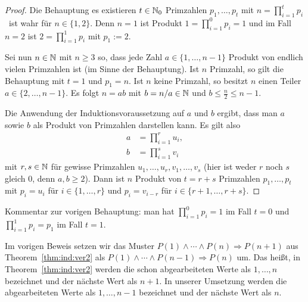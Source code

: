 \begin{proof} 
	Die Behauptung \glqq es existieren $t \in \mathbb{N}_0$ Primzahlen $p_1,\ldots,p_t$ mit $n=\prod_{i=1}^t p_i$\grqq\ ist wahr für $n \in\{1,2\}$. Denn $n=1$ ist Produkt $1= \prod_{i=1}^0 p_i = 1$ und im Fall $n=2$ ist $2 = \prod_{i=1}^1 p_i$ mit $p_1:=2$.
	
	Sei nun $n \in \mathbb{N}$ mit $n \ge 3$ so, dass jede Zahl $a \in \{1,\ldots,n-1\}$ Produkt von endlich vielen Primzahlen ist (im Sinne der Behauptung). Ist $n$ Primzahl, so gilt die Behauptung mit $t=1$ und $p_1 = n$. Ist $n$ keine Primzahl, so besitzt $n$ einen Teiler $a \in \{2,\ldots,n-1\}$. Es folgt $n = a b$ mit $b = n / a \in \mathbb{N}$ und $b \le \frac{n}{2} \le n-1$.
	
	Die Anwendung der Induktionsvoraussetzung auf $a$ und $b$ ergibt, dass man $a$ sowie $b$ als Produkt von Primzahlen darstellen kann. Es gilt also 
	\begin{align*}
			a & = \prod_{i=1}^{r} u_i, 
		\\	b & = \prod_{i=1}^s  v_i
	\end{align*} 
	mit $r, s \in \mathbb{N}$ für gewisse Primzahlen $u_1,\ldots,u_r,v_1,\ldots,v_s$ (hier ist weder $r$ noch $s$ gleich $0$, denn $a,b \ge 2$). 
	Dann ist $n$ Produkt von $t = r+s$ Primzahlen $p_1,\ldots,p_t$ mit $p_i = u_i$ für $i \in \{1,\ldots,r\}$ und $p_i = v_{i-r}$ für $i \in \{r+1,\ldots,r+s\}$. 
\end{proof} 

\begin{bem}
	Kommentar zur  vorigen Behauptung: man hat $\prod_{i=1}^0 p_i = 1$ im Fall $t=0$ und $\prod_{i=1}^1 p_i = p_1$ im Fall $t=1$. 
\end{bem} 


\begin{bem}
	Im vorigen Beweis setzen wir das Muster $P(1) \wedge \cdots \wedge P(n) \Rightarrow P(n+1)$ aus Theorem~\ref{thm:ind:ver2} als $P(1) \wedge \cdots \wedge P(n-1) \Rightarrow P(n)$ um. Das heißt, in Theorem~\ref{thm:ind:ver2} werden die schon abgearbeiteten Werte als $1,\ldots,n$ bezeichnet und der nächste Wert als $n+1$. In unserer Umsetzung werden die abgearbeiteten Werte als $1,\ldots,n-1$ bezeichnet und der nächste Wert als $n$. 
\end{bem} 


